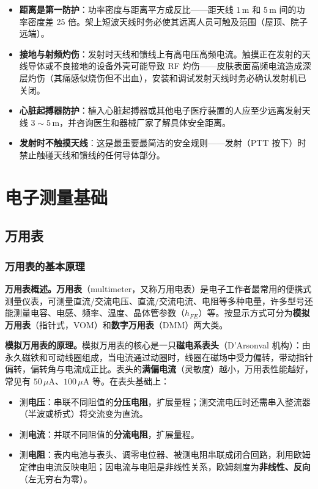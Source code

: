 \documentclass[12pt,UTF8]{ctexbook}
\begin{document}
\begin{itemize}
  \item \textbf{距离是第一防护}：功率密度与距离平方成反比——距天线 $1\,\mathrm{m}$ 和 $5\,\mathrm{m}$ 间的功率密度差 25 倍。架上短波天线时务必使其远离人员可触及范围（屋顶、院子远端）。
  \item \textbf{接地与射频灼伤}：发射时天线和馈线上有高电压高频电流。触摸正在发射的天线导体或不良接地的设备外壳可能导致 RF 灼伤——皮肤表面高频电流造成深层灼伤（其痛感似烧伤但不出血），安装和调试发射天线时务必确认发射机已关闭。
  \item \textbf{心脏起搏器防护}：植入心脏起搏器或其他电子医疗装置的人应至少远离发射天线 $3\sim5\,\mathrm{m}$，并咨询医生和器械厂家了解具体安全距离。
  \item \textbf{发射时不触摸天线}：这是最重要最简洁的安全规则——发射（PTT 按下）时禁止触碰天线和馈线的任何导体部分。
\end{itemize}

\chapter{电子测量基础}
\label{chap:measurement_basics}

\section{万用表}
\label{sec:multimeter}

\subsection{万用表的基本原理}

\textbf{万用表概述。}\textbf{万用表}（multimeter，又称万用电表）是电子工作者最常用的便携式测量仪表，可测量直流/交流电压、直流/交流电流、电阻等多种电量，许多型号还能测量电容、电感、频率、温度、晶体管参数（$h_{FE}$）等。按显示方式可分为\textbf{模拟万用表}（指针式，VOM）和\textbf{数字万用表}（DMM）两大类。

\textbf{模拟万用表的原理。}模拟万用表的核心是一只\textbf{磁电系表头}（D'Arsonval 机构）：由永久磁铁和可动线圈组成，当电流通过动圈时，线圈在磁场中受力偏转，带动指针偏转，偏转角与电流成正比。表头的\textbf{满偏电流}（灵敏度）越小，万用表性能越好，常见有 $50\,\mu\mathrm{A}$、$100\,\mu\mathrm{A}$ 等。在表头基础上：
\begin{itemize}
  \item 测\textbf{电压}：串联不同阻值的\textbf{分压电阻}，扩展量程；测交流电压时还需串入整流器（半波或桥式）将交流变为直流。
  \item 测\textbf{电流}：并联不同阻值的\textbf{分流电阻}，扩展量程。
  \item 测\textbf{电阻}：表内电池与表头、调零电位器、被测电阻串联成闭合回路，利用欧姆定律由电流反映电阻；因电流与电阻是非线性关系，欧姆刻度为\textbf{非线性、反向}（左无穷右为零）。
\end{itemize}
\end{document}
